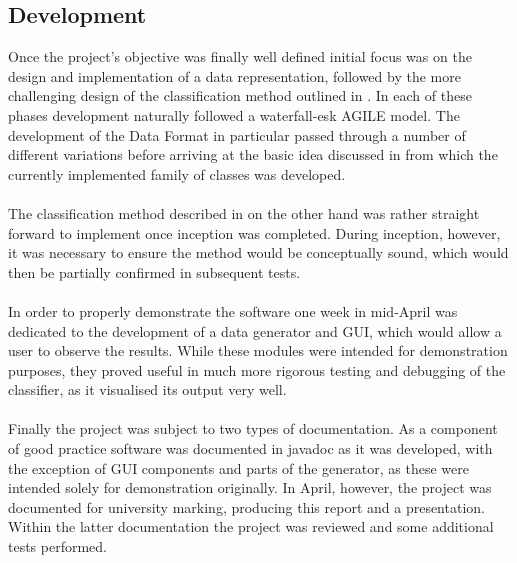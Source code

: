 \documentclass[main.tex]{subfiles}
\begin{document}
    \subsection{Development}
    
      Once the project's objective was finally well defined initial focus was on the design and implementation of a data representation, followed by the more challenging design of the classification method outlined in . In each of these phases development naturally followed a waterfall-esk AGILE model. The development of the Data Format in particular passed through a number of different variations before arriving at the basic idea discussed in  from which the currently implemented family of classes was developed.
      \\\\
      The classification method described in  on the other hand was rather straight forward to implement once inception was completed. During inception, however, it was necessary to ensure the method would be conceptually sound, which would then be partially confirmed in subsequent tests.
      \\\\
      In order to properly demonstrate the software one week in mid-April was dedicated to the development of a data generator and GUI, which would allow a user to observe the results. While these modules were intended for demonstration purposes, they proved useful in much more rigorous testing and debugging of the classifier, as it visualised its output very well.
      \\\\
      Finally the project was subject to two types of documentation. As a component of good practice software was documented in javadoc as it was developed, with the exception of GUI components and parts of the generator, as these were intended solely for demonstration originally. In April, however, the project was documented for university marking, producing this report and a presentation. Within the latter documentation the project was reviewed and some additional tests performed.
    
\end{document}
